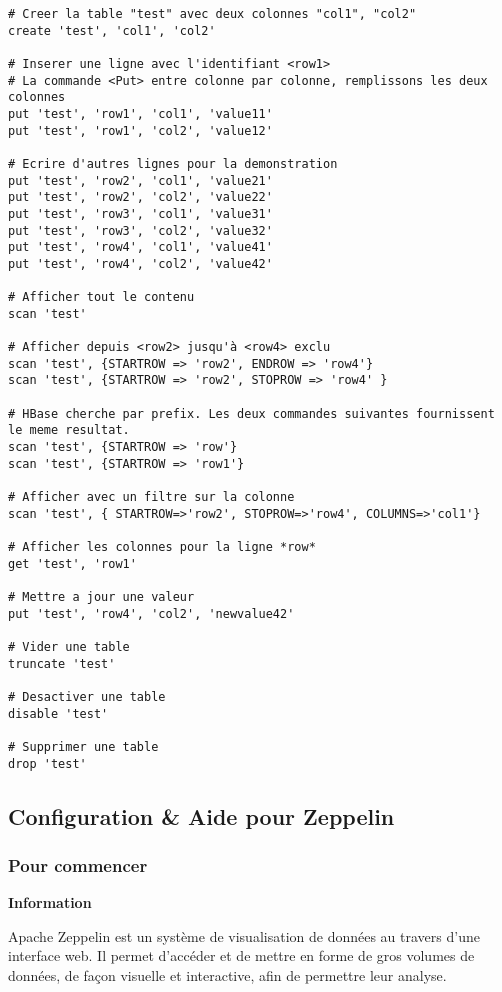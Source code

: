 \documentclass[a4paper,oneside,12pt]{article}
\begin{document}
\begin{verbatim}
# Creer la table "test" avec deux colonnes "col1", "col2" 
create 'test', 'col1', 'col2'

# Inserer une ligne avec l'identifiant <row1>
# La commande <Put> entre colonne par colonne, remplissons les deux colonnes
put 'test', 'row1', 'col1', 'value11'
put 'test', 'row1', 'col2', 'value12'

# Ecrire d'autres lignes pour la demonstration
put 'test', 'row2', 'col1', 'value21'
put 'test', 'row2', 'col2', 'value22'
put 'test', 'row3', 'col1', 'value31'
put 'test', 'row3', 'col2', 'value32'
put 'test', 'row4', 'col1', 'value41'
put 'test', 'row4', 'col2', 'value42'

# Afficher tout le contenu
scan 'test'

# Afficher depuis <row2> jusqu'à <row4> exclu
scan 'test', {STARTROW => 'row2', ENDROW => 'row4'}
scan 'test', {STARTROW => 'row2', STOPROW => 'row4' }

# HBase cherche par prefix. Les deux commandes suivantes fournissent le meme resultat.
scan 'test', {STARTROW => 'row'}
scan 'test', {STARTROW => 'row1'}

# Afficher avec un filtre sur la colonne
scan 'test', { STARTROW=>'row2', STOPROW=>'row4', COLUMNS=>'col1'}

# Afficher les colonnes pour la ligne *row*
get 'test', 'row1'

# Mettre a jour une valeur
put 'test', 'row4', 'col2', 'newvalue42'

# Vider une table
truncate 'test'

# Desactiver une table
disable 'test'

# Supprimer une table
drop 'test'

\end{verbatim}

\subsection{Configuration \& Aide pour Zeppelin}

\subsubsection{Pour commencer}

\textbf{Information}

Apache Zeppelin est un système de visualisation de données au travers d'une 
interface web. 
Il permet d'accéder et de mettre en forme de gros volumes de données,
de façon visuelle et interactive, afin de permettre leur analyse.
\end{document}
